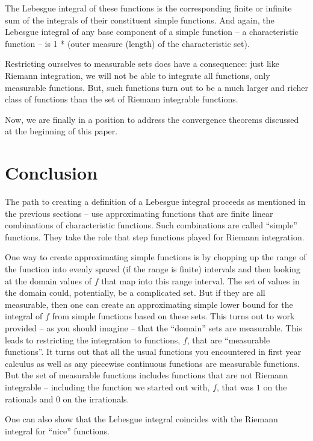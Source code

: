 \documentclass{article}
\begin{document}
The Lebesgue integral of these functions is the corresponding finite or infinite
sum of the integrals of their constituent simple functions. And again, the Lebesgue
integral of any base component of a simple function -- a characteristic function --
is 1 * (outer measure (length) of the characteristic set).

Restricting ourselves to measurable sets does have a consequence: just like 
Riemann integration, we will not be able to integrate all functions, only 
measurable functions. But, such functions turn out to be a 
much larger and richer class of functions than the set of Riemann integrable functions.

Now, we are finally in a position to address the convergence theorems 
discussed at the beginning of this paper.


\section{Conclusion}

The path to creating a definition of a Lebesgue integral proceeds as mentioned 
in the previous sections -- use approximating functions that are finite linear
combinations of characteristic functions. Such combinations are called ``simple''
functions. They take the role that step functions played for Riemann integration. 

One way to create approximating simple functions is by chopping up the range 
of the function into evenly spaced (if the range is finite) intervals and then 
looking at the domain values of $f$ that map into this range interval. 
The set of values in the domain could, potentially, be a complicated set. 
But if they are all measurable, then one can create an approximating simple 
lower bound for the integral of $f$ from simple functions based on these sets. 
This turns out to work provided -- as you should imagine -- that the ``domain'' 
sets are measurable. This leads to restricting the integration to functions, $f$, 
that are ``measurable functions''. It turns out that all the usual functions you 
encountered in first year calculus as well as any piecewise continuous functions 
are measurable functions. But the set of measurable functions includes functions 
that are not Riemann integrable -- including the function we started out with, $f$, 
that was $1$ on the rationals and $0$ on the irrationals.

One can also show that the Lebesgue integral coincides with the Riemann integral 
for ``nice'' functions.
\end{document}
